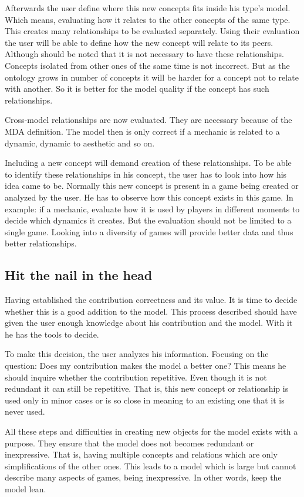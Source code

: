 Afterwards the user define where this new concepts fits inside his type's model. Which means, evaluating how it relates to the other concepts of the same type. This creates many relationships to be evaluated separately. Using their evaluation the user will be able to define how the new concept will relate to its peers. Although should be noted that it is not necessary to have these relationships. Concepts isolated from other ones of the same time is not incorrect. But as the ontology grows in number of concepts it will be harder for a concept not to relate with another. So it is better for the model quality if the concept has such relationships.

Cross-model relationships are now evaluated. They are necessary because of the MDA definition. The model then is only correct if a mechanic is related to a dynamic, dynamic to aesthetic and so on.

Including a new concept will demand creation of these relationships. To be able to identify these relationships in his concept, the user has to look into how his idea came to be. Normally this new concept is present in a game being created or analyzed by the user. He has to observe how this concept exists in this game. In example: if a mechanic, evaluate how it is used by players in different moments to decide which dynamics it creates. But the evaluation should not be limited to a single game. Looking into a diversity of games will provide better data and thus better relationships.

\subsection{Hit the nail in the head}

Having established the contribution correctness and its value. It is time to decide whether this is a good addition to the model. This process described should have given the user enough knowledge about his contribution and the model. With it he has the tools to decide.

To make this decision, the user analyzes his information. Focusing on the question: Does my contribution makes the model a better one? This means he should inquire whether the contribution repetitive. Even though it is not redundant it can still be repetitive. That is, this new concept or relationship is used only in minor cases or is so close in meaning to an existing one that it is never used.

All these steps and difficulties in creating new objects for the model exists with a purpose. They ensure that the model does not becomes redundant or inexpressive. That is, having multiple concepts and relations which are only simplifications of the other ones. This leads to a model which is large but cannot describe many aspects of games, being inexpressive. In other words, keep the model lean. 
